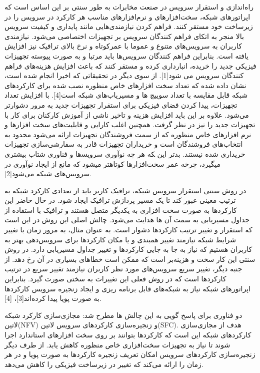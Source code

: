 \documentclass{book}
\begin{document}

راه‌اندازی و استقرار سرویس در صنعت مخابرات به طور سنتی بر این اساس است که اپراتورهای شبکه، سخت‌افزارهای و نرم‌افزارهای مناسب هر کارکرد در سرویس را در زیرساخت خود مستقر کنند.
فراهم کردن نیازمندی‌هایی مانند پایداری و کیفیت سرویس بالا منجر به اتکای فراهم کنندگان سرویس بر تجهیزات اختصاصی می‌شود.
نیازمندی کاربران به سرویس‌های متنوع و عموما با عمرکوتاه و نرخ بالای ترافیک نیز افزایش یافته است.
بنابراین فراهم کنندگان سرویس‌ها باید مرتبا و به صورت پیوسته تجهیزات فیزیکی جدید را خریده، انبارداری کرده و مستقر کنند که باعث افزایش هزینه‌های فراهم کنندگان سرویس می شود[1].
از سوی دیگر در تحقیقاتی که اخیرا انجام شده است، نشان داده شده که تعداد سخت افزارهای خاص منظوره نصب شده برای کارکردهای شبکه قابل مقایسه با تعداد سوییچ ها و مسیریاب‌های شبکه
است[4].
با افزایش تعداد تجهیزات، پیدا کردن فضای فیزیکی برای استقرار تجهیزات جدید به مرور دشوارتر می‌شود.
علاوه بر این باید افزایش هزینه و تاخیر ناشی از آموزش کارکنان برای کار با تجهیزات جدید را نیز در نظر گرفت.
همچنین اغلب کارایی و قابلیت‌های سخت افزارها و نرم افزارهای خاص منظوره که از سمت فروشندگان تجهیزات ارائه می‌شود محدود به انتخاب‌های فروشندگان است
و خریداران تجهیزات قادر به سفارشی‌سازی تجهیزات خریداری شده نیستند.
بدتر این ‍که هر چه نوآوری سرویس‍‌ها و فناوری شتاب بیشتری می‍گیرد، چرخه عمر سخت‌افزارها کوتاه‍تر می‍شود که مانع از ایجاد نوآوری در سرویس‌های شبکه می‌شود[2].

در روش سنتی استقرار سرویس شبکه، ترافیک کاربر باید از تعدادی کارکرد شبکه به ترتیب معینی عبور کند تا یک مسیر پردازش ترافیک ایجاد شود.
در حال حاضر این کارکردها به صورت سخت افزاری به یکدیگر متصل هستند و ترافیک با استفاده از جداول مسیریابی به سمت آن ها هدایت می‌شود.
چالش اصلی این روش در این است که استقرار و تغییر ترتیب کارکردها دشوار است.
به عنوان مثال، به مرور زمان با تغییر شرایط شبکه نیازمند تغییر همبندی و یا مکان کارکردها برای سرویس‌دهی بهتر به کاربران هستیم
که نیاز به جا به جایی کارکردها و تغییر جداول مسیریابی دارد.
در روش سنتی این کار سخت و هزینه‌بر است که ممکن است خطاهای بسیاری در آن رخ دهد.
از جنبه دیگر، تغییر سریع سرویس‌های مورد نظر کاربران نیازمند تغییر سریع در ترتیب کارکردها است که در روش فعلی این تغییرات به سختی صورت گیرد.
بنابراین اپراتورهای شبکه نیاز به شبکه‌های قابل برنامه ریزی و ایجاد زنجیره سرویس کارکردها به صورت پویا پیدا کرده‌اند[3]، [4].‍‍

دو فناوری برای پاسخ گویی به این چالش ها مطرح شد: مجازی‌سازی کارکرد شبکه ‌لاتین{(NFV)} و زنجیره‌سازی کارکردهای سرویس ‌لاتین{(SFC)}.‍
هدف از مجازی‌سازی کارکردهای شبکه این است که کارکردها بتوانند بر روی سخت افزارهای استاندارد اجرا شوند تا
نیاز به تجهیزات سخت‌افزاری خاص منظوره کاهش یابد.
از طرف دیگر زنجیره‌سازی کارکردهای سرویس امکان تعریف زنجیره کارکردها به صورت پویا و در هر زمان را ارائه می‌کند که تغییر در زیرساخت فیزیکی را کاهش می‌دهد.
\end{document}
